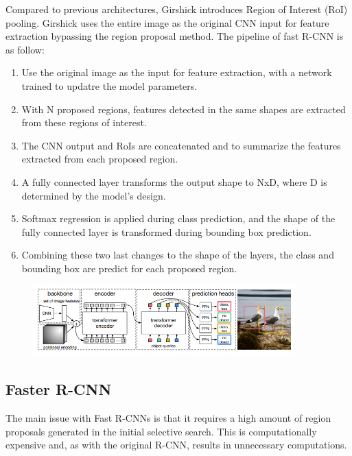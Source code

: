 \documentclass[12pt,a4paper,twocolumn,twoside]{article}
\begin{document}
Compared to previous architectures, Girshick introduces Region of Interest (RoI) pooling. Girshick uses the entire image as the original CNN input for feature extraction bypassing the region proposal method. The pipeline of fast R-CNN is as follow:

\begin{enumerate}
    \item Use the original image as the input for feature extraction, with a network trained to updatre the model parameters.
    \item With N proposed regions, features detected in the same shapes are extracted from these regions of interest. 
    \item The CNN output and RoIs are concatenated and to summarize the features extracted from each proposed region.
    \item A fully connected layer transforms the output shape to NxD, where D is determined by the model's design.
    \item Softmax regression is applied during class prediction, and the shape of the fully connected layer is transformed during bounding box prediction.
    \item Combining these two last changes to the shape of the layers, the class and bounding box are predict for each proposed region.
\end{enumerate}

\begin{figure}[hb!]    
    \centering
        \includegraphics[width=0.9\textwidth]{Resources/Images/detr.png}
    \label{fig:detr}
\end{figure}

\subsection{Faster R-CNN}
The main issue with Fast R-CNNs is that it requires a high amount of region proposals generated in the initial selective search. This is computationally expensive and, as with the original R-CNN, results in unnecessary computations. 
\end{document}
